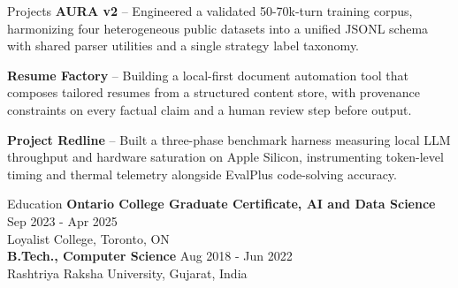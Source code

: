 \documentclass{resume}
\begin{document}
\begin{rSection}{Projects}
\vspace{0.4em}
\textbf{AURA v2} -- Engineered a validated 50-70k-turn training corpus, harmonizing four heterogeneous public datasets into a unified JSONL schema with shared parser utilities and a single strategy label taxonomy.

\textbf{Resume Factory} -- Building a local-first document automation tool that composes tailored resumes from a structured content store, with provenance constraints on every factual claim and a human review step before output.

\textbf{Project Redline} -- Built a three-phase benchmark harness measuring local LLM throughput and hardware saturation on Apple Silicon, instrumenting token-level timing and thermal telemetry alongside EvalPlus code-solving accuracy.

\end{rSection}

\begin{rSection}{Education}
\vspace{0.4em}
\textbf{Ontario College Graduate Certificate, AI and Data Science} \hfill Sep 2023 - Apr 2025 \\
Loyalist College, Toronto, ON \\
\textbf{B.Tech., Computer Science} \hfill Aug 2018 - Jun 2022 \\
Rashtriya Raksha University, Gujarat, India
\end{rSection}
\end{document}
